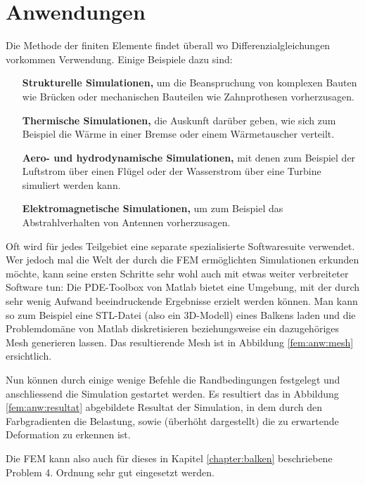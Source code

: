 %
%
%
%
\section{Anwendungen\label{fem:section:anwendungen}}



Die Methode der finiten Elemente findet überall wo Differenzialgleichungen vorkommen Verwendung.
Einige Beispiele dazu sind:
\begin{itemize}
    \item [\textbf{Strukturelle Simulationen,}] um die Beanspruchung von komplexen Bauten wie Brücken oder mechanischen Bauteilen wie Zahnprothesen vorherzusagen.
    \item [\textbf{Thermische Simulationen,}] die Auskunft darüber geben, wie sich zum Beispiel die Wärme in einer Bremse oder einem Wärmetauscher verteilt.
    \item [\textbf{Aero- und hydrodynamische Simulationen,}] mit denen zum Beispiel der Luftstrom über einen Flügel oder der Wasserstrom über eine Turbine simuliert werden kann.
    \item [\textbf{Elektromagnetische Simulationen,}] um zum Beispiel das Abstrahlverhalten von Antennen vorherzusagen.
\end{itemize}

Oft wird für jedes Teilgebiet eine separate spezialisierte Softwaresuite verwendet.
Wer jedoch mal die Welt der durch die FEM ermöglichten Simulationen erkunden möchte, kann seine ersten Schritte sehr wohl auch mit etwas weiter verbreiteter Software tun: 
Die PDE-Toolbox von Matlab bietet eine Umgebung, mit der durch sehr wenig Aufwand beeindruckende Ergebnisse erzielt werden können.
Man kann so zum Beispiel eine STL-Datei (also ein 3D-Modell) eines Balkens laden und die Problemdomäne von Matlab diskretisieren beziehungsweise ein dazugehöriges Mesh generieren lassen. 
Das resultierende Mesh ist in Abbildung \ref{fem:anw:mesh} ersichtlich.

Nun können durch einige wenige Befehle die Randbedingungen festgelegt und anschliessend die Simulation gestartet werden.
Es resultiert das in Abbildung \ref{fem:anw:resultat} abgebildete Resultat der Simulation, in dem durch den Farbgradienten die Belastung, sowie (überhöht dargestellt) die zu erwartende Deformation zu erkennen ist.

Die FEM kann also auch für dieses in Kapitel \ref{chapter:balken} beschriebene Problem 4. Ordnung sehr gut eingesetzt werden.
